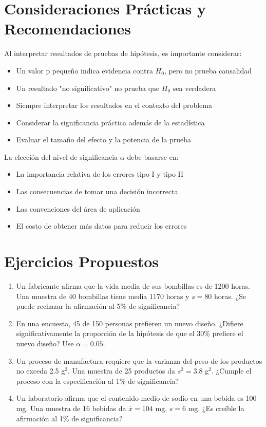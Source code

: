 \section{Consideraciones Prácticas y Recomendaciones}

\begin{remark}
Al interpretar resultados de pruebas de hipótesis, es importante considerar:
\begin{itemize}
    \item Un valor p pequeño indica evidencia contra $H_0$, pero no prueba causalidad
    \item Un resultado "no significativo" no prueba que $H_0$ sea verdadera
    \item Siempre interpretar los resultados en el contexto del problema
    \item Considerar la significancia práctica además de la estadística
    \item Evaluar el tamaño del efecto y la potencia de la prueba
\end{itemize}
\end{remark}

\begin{remark}
La elección del nivel de significancia $\alpha$ debe basarse en:
\begin{itemize}
    \item La importancia relativa de los errores tipo I y tipo II
    \item Las consecuencias de tomar una decisión incorrecta
    \item Las convenciones del área de aplicación
    \item El costo de obtener más datos para reducir los errores
\end{itemize}
\end{remark}

\section{Ejercicios Propuestos}

\begin{enumerate}
    \item Un fabricante afirma que la vida media de sus bombillas es de 1200 horas. Una muestra de 40 bombillas tiene media 1170 horas y $s = 80$ horas. ¿Se puede rechazar la afirmación al 5\% de significancia?
    
    \item En una encuesta, 45 de 150 personas prefieren un nuevo diseño. ¿Difiere significativamente la proporción de la hipótesis de que el 30\% prefiere el nuevo diseño? Use $\alpha = 0.05$.
    
    \item Un proceso de manufactura requiere que la varianza del peso de los productos no exceda 2.5 g$^2$. Una muestra de 25 productos da $s^2 = 3.8$ g$^2$. ¿Cumple el proceso con la especificación al 1\% de significancia?
    
    \item Un laboratorio afirma que el contenido medio de sodio en una bebida es 100 mg. Una muestra de 16 bebidas da $\overline{x} = 104$ mg, $s = 6$ mg. ¿Es creíble la afirmación al 1\% de significancia?
\end{enumerate}
